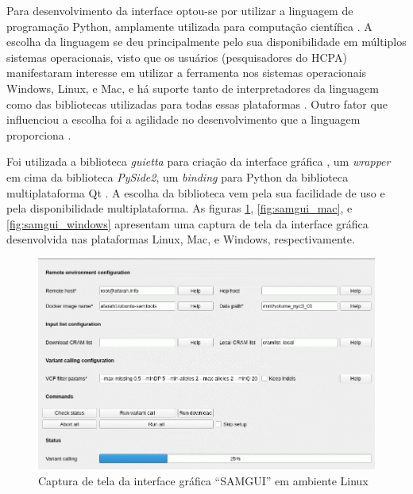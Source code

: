 \documentclass[cic,tc]{iiufrgs}
\begin{document}
Para desenvolvimento da interface optou-se por utilizar a linguagem de
programação Python, amplamente utilizada para computação
científica \cite{oliphant2007python}. A escolha da linguagem se deu
principalmente pelo sua disponibilidade em múltiplos sistemas operacionais,
visto que os usuários (pesquisadores do HCPA) manifestaram interesse em
utilizar a ferramenta nos sistemas operacionais Windows, Linux, e Mac, e há
suporte tanto de interpretadores da linguagem como das bibliotecas utilizadas
para todas essas plataformas \cite{oliphant2007python}. Outro fator que
influenciou a escolha foi a agilidade no desenvolvimento que a linguagem
proporciona \cite{oliphant2007python}.

Foi utilizada a biblioteca \textit{guietta} para criação da interface
gráfica \cite{guietta}, um \textit{wrapper} em cima da biblioteca
\textit{PySide2}, um \textit{binding} para Python da biblioteca multiplataforma
Qt \cite{loganathan2013pyside}. A escolha da biblioteca vem pela sua facilidade
de uso e pela disponibilidade multiplataforma. As figuras
\ref{fig:samgui_linux}, \ref{fig:samgui_mac}, e \ref{fig:samgui_windows}
apresentam uma captura de tela da interface gráfica desenvolvida nas
plataformas Linux, Mac, e Windows, respectivamente.

\begin{figure}
  \caption{Captura de tela da interface gráfica ``SAMGUI'' em ambiente Linux}
    \begin{center}
      \includegraphics[width=0.85\linewidth]{img/samgui_linux.png}
    \end{center}
    \label{fig:samgui_linux}
\end{figure}
\end{document}
